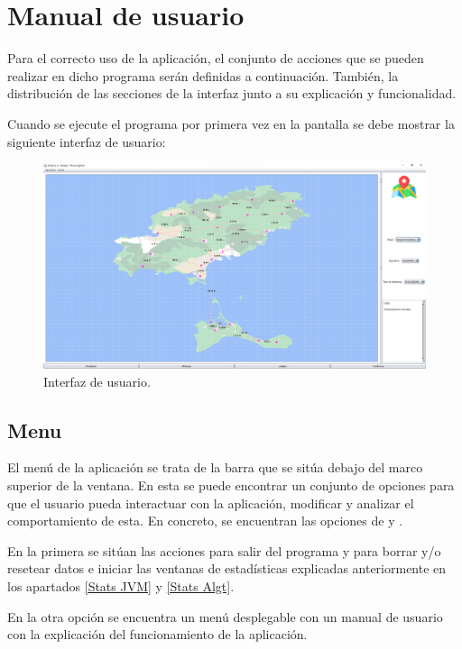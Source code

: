 \section{Manual de usuario}\label{Manual usuario}

Para el correcto uso de la aplicación, el conjunto de acciones que se pueden realizar en dicho programa serán definidas a continuación. También, la distribución de las secciones de la interfaz junto a su explicación y funcionalidad.\bigskip

Cuando se ejecute el programa por primera vez en la pantalla se debe mostrar la siguiente interfaz de usuario:

\begin{figure}[!h]
    \centering
    \includegraphics[width=\linewidth]{Usage/img/GUI.png}
    \caption{Interfaz de usuario.}
    \label{fig:User_interface}
\end{figure}

\subsection{Menu}\label{Manual usuario, Header}

El menú de la aplicación se trata de la barra que se sitúa debajo del marco superior de la ventana. En esta se puede encontrar un conjunto de opciones para que el usuario pueda interactuar con la aplicación, modificar y analizar el comportamiento de esta. En concreto, se encuentran las opciones de  y .\bigskip

En la primera se sitúan las acciones para salir del programa y para borrar y/o resetear datos e iniciar las ventanas de estadísticas explicadas anteriormente en los apartados \ref{Stats JVM} y \ref{Stats Algt}.\bigskip

En la otra opción se encuentra un menú desplegable con un manual de usuario con la explicación del funcionamiento de la aplicación.

